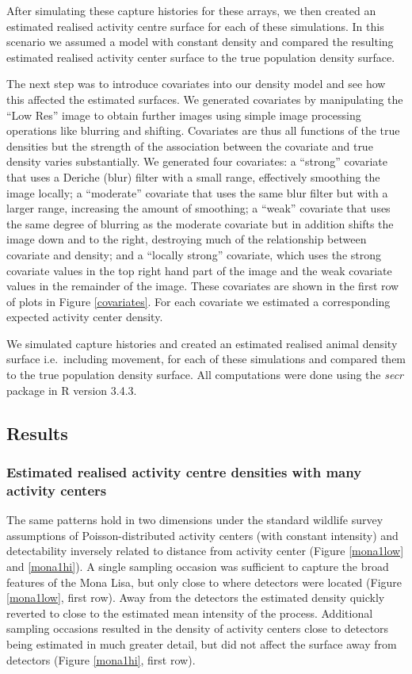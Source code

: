 \documentclass[a4paper,12pt]{article}
\begin{document}
After simulating these capture histories for these arrays, we then created an estimated realised activity centre surface for each of these simulations. In this scenario we assumed a model with constant density and compared the resulting estimated realised activity center surface to the true population density surface.

The next step was to introduce covariates into our density model and see how this affected the estimated surfaces. We generated covariates by manipulating the ``Low Res'' image to obtain further images using simple image processing operations like blurring and shifting. Covariates are thus all functions of the true densities but the strength of the association between the covariate and true density varies substantially. We generated four covariates: a ``strong'' covariate that uses a Deriche (blur) filter with a small range, effectively smoothing the image locally; a ``moderate'' covariate that uses the same blur filter but with a larger range, increasing the amount of smoothing; a ``weak'' covariate that uses the same degree of blurring as the moderate covariate but in addition shifts the image down and to the right, destroying much of the relationship between covariate and density; and a ``locally strong'' covariate, which uses the strong covariate values in the top right hand part of the image and the weak covariate values in the remainder of the image. These covariates are shown in the first row of plots in Figure \ref{covariates}. For each covariate we estimated a corresponding expected activity center density.

We simulated capture histories and created an estimated realised animal density surface i.e.\ including movement, for each of these simulations and compared them to the true population density surface. All computations were done using the {\it secr} package in R version 3.4.3. 

\subsection{Results}

\subsubsection{Estimated realised activity centre densities with many activity centers}

The same patterns hold in two dimensions under the standard wildlife survey assumptions of Poisson-distributed activity centers (with constant intensity) and detectability inversely related to distance from activity center (Figure \ref{mona1low} and \ref{mona1hi}). A single sampling occasion was sufficient to capture the broad features of the Mona Lisa, but only close to where detectors were located (Figure \ref{mona1low}, first row). Away from the detectors the estimated density quickly reverted to close to the estimated mean intensity of the process. Additional sampling occasions resulted in the density of activity centers close to detectors being estimated in much greater detail, but did not affect the surface away from detectors (Figure \ref{mona1hi}, first row). 
\end{document}
